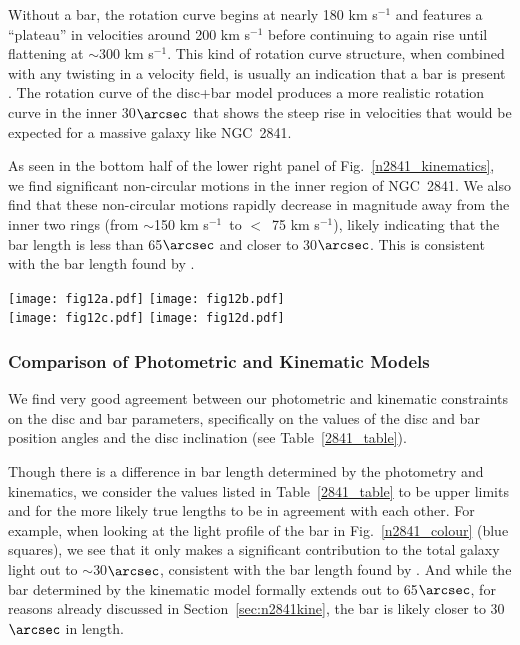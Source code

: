 \documentclass[a4paper,fleqn,usenatbib]{mnras}
\begin{document}
Without a bar, the rotation curve begins at nearly 180 km s$^{-1}$ and features a ``plateau'' in velocities around 200 km s$^{-1}$ before continuing to again rise until flattening at $\sim$300 km s$^{-1}$.  This kind of rotation curve structure, when combined with any twisting in a velocity field, is usually an indication that a bar is present \citep[see, for example, UGC~1551 in][]{kuzio2008}.  The rotation curve of the disc+bar model produces a more realistic rotation curve in the inner 30$\arcsec$ that shows the steep rise in velocities that would be expected for a massive galaxy like NGC~2841.  

As seen in the bottom half of the lower right panel of Fig.~\ref{n2841_kinematics}, we find significant non-circular motions in the inner region of NGC~2841.   We also find that these non-circular motions rapidly decrease in magnitude away from the inner two rings (from $\sim$150 km s$^{-1}$\ to $<$\ 75 km s$^{-1}$), likely indicating that the bar length is less than 65$\arcsec$ and closer to 30$\arcsec$. This is consistent with the bar length found by \citet{afanasiev1999}.

\begin{figure*}
	\center
    	\hskip 10mm \texttt{[image: fig12a.pdf]} \hskip 2mm \texttt{[image: fig12b.pdf]}\\
	\hskip 2mm
    	\texttt{[image: fig12c.pdf]} \hskip 2mm \texttt{[image: fig12d.pdf]}
  	\caption{Same as Fig.~\ref{n6674_kinematics} but for NGC~2841.}
  	\label{n2841_kinematics}
\end{figure*}

\subsubsection{Comparison of Photometric and Kinematic Models}
\label{sec:n2841compare}

We find very good agreement between our photometric and kinematic constraints on the disc and bar parameters, specifically on the values of the disc and bar position angles and the disc inclination (see Table~\ref{2841_table}).

Though there is a difference in bar length determined by the photometry and kinematics, we consider the values listed in Table~\ref{2841_table} to be upper limits and for the more likely true lengths to be in agreement with each other. For example, when looking at the light profile of the bar in Fig.~\ref{n2841_colour} (blue squares), we see that it only makes a significant contribution to the total galaxy light out to $\sim$30$\arcsec$, consistent with the bar length found by \citet{afanasiev1999}. And while the bar determined by the kinematic model formally extends out to 65$\arcsec$, for reasons already discussed in Section~\ref{sec:n2841kine}, the bar is likely closer to 30$\arcsec$ in length.  
\end{document}
